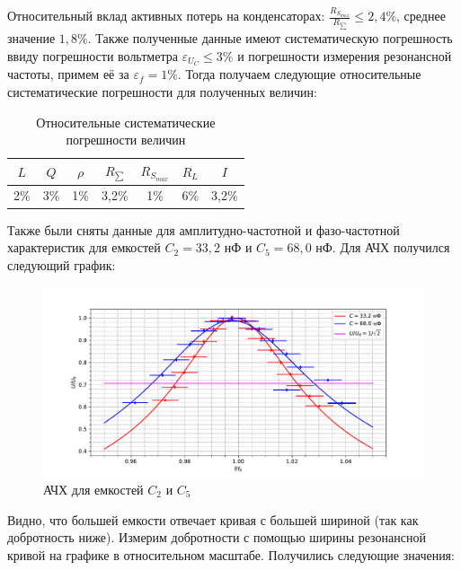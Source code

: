 \documentclass[a4paper, 12pt]{article}
\begin{document}
	Относительный вклад активных потерь на конденсаторах: $\frac{R_{S_{max}}}{R_{\sum}} \leq 2,4 \% $, среднее значение $1,8 \%$. Также полученные данные имеют систематическую погрешность ввиду погрешности вольтметра $\varepsilon_{U_C} \leq 3\%$ и погрешности измерения резонансной частоты, примем её за $\varepsilon_f = 1 \%$. Тогда получаем следующие относительные систематические погрешности для полученных величин:
	\begin{table}[h!]
		\centering
		\begin{tabular}{|c|c|c|c|c|c|c|}
			\hline
			$L$ & $Q$ & $\rho$ & $R_{\sum}$ & $R_{S_{max}}$ & $R_L$ & $I$ \\ \hline
			2\% & 3\% & 1\% & 3,2\% & 1\% & 6\% & 3,2\% \\ \hline
		\end{tabular}
		\caption{Относительные систематические погрешности величин}
	\end{table}

	Также были сняты данные для амплитудно-частотной и фазо-частотной характеристик для емкостей $C_2 = 33,2$ нФ и $C_5 = 68,0$ нФ. Для АЧХ получился следующий график:

	\begin{figure}[h]
                \centering
		\includegraphics[width = \textwidth]{ACH.pdf}
		\caption{АЧХ для емкостей $C_2$ и $C_5$}
	\end{figure}

	Видно, что большей емкости отвечает кривая с большей шириной (так как добротность ниже). Измерим добротности с помощью ширины резонансной кривой на графике в относительном масштабе. Получились следующие значения:

\end{document}

